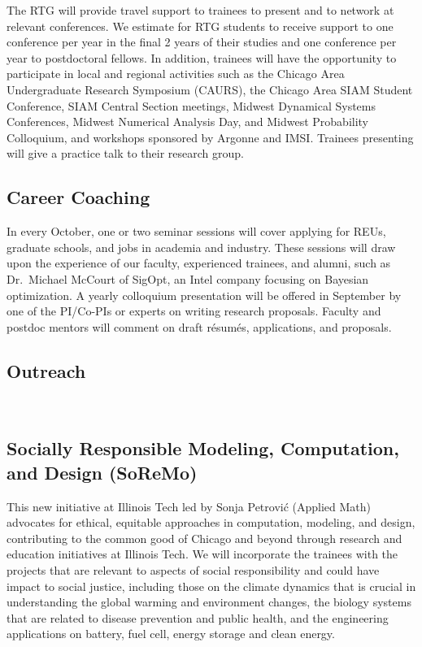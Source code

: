 \documentclass[11pt]{NSFamsart}
\newcommand{\FredNote}[1]{{\color{blue} Fred: #1}}
\begin{document}
The RTG will provide travel support to trainees to  present   and to network at relevant conferences. We estimate for RTG students to receive support to one conference per year in the final 2 years of their studies and one conference per year to postdoctoral fellows.  In addition, trainees will have the opportunity to participate in local and regional activities such as the Chicago Area Undergraduate Research Symposium (CAURS), the Chicago Area SIAM Student Conference, SIAM Central Section meetings, Midwest Dynamical Systems Conferences, Midwest Numerical Analysis Day, and Midwest Probability Colloquium, and workshops sponsored by Argonne and IMSI. Trainees presenting will give a practice talk to their research group.

\subsection*{Career Coaching}
In every October, one or two seminar sessions will cover applying for REUs, graduate schools, and jobs in academia and industry. These sessions will draw upon the experience of our faculty, experienced trainees, and alumni, such as Dr.\ Michael McCourt of SigOpt, an Intel company focusing on Bayesian optimization.  A yearly colloquium presentation  will be offered in September by one of the PI/Co-PIs or experts on writing research proposals. Faculty and postdoc mentors will comment on draft r\'esum\'es,  applications, and proposals.  





 
\subsection{Outreach}\\
\subsection*{Socially Responsible Modeling, Computation, and Design
(SoReMo)}
This new initiative at Illinois Tech led by Sonja Petrovi\'c (Applied Math) advocates for ethical, equitable approaches in computation,
modeling, and design, contributing to the common good of Chicago and
beyond through research and education initiatives at Illinois Tech.
 We will incorporate the trainees with the projects that are relevant to aspects of social responsibility and could have impact to social justice, including those on the climate dynamics that is crucial in understanding the global warming and environment changes, the biology systems that are related to disease prevention and public health,  and the engineering applications on battery, fuel cell, energy storage and clean energy.
\end{document}

